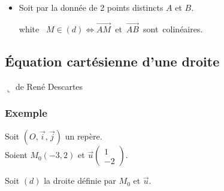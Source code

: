 \begin{itemize}
\item Soit par la donnée de 2 points distincts $A$ et $B$.

\begin{center}
\end{center}

\vspace{.5cm}

\begin{center}
      {white}{
     \hbox{
       $M\in(d)\Longleftrightarrow\overrightarrow{AM}$ 
           et $\overrightarrow{AB}$ sont colinéaires.}}
\end{center}

\end{itemize}

\newpage 


\subsection{Équation cartésienne d'une droite}
\vspace{-.4cm}\hspace{3cm}$\llcorner$ {\footnotesize de René Descartes}

\subsubsection{Exemple }
Soit $(O, \vec{i}, \vec{j})$ un repère. \\
Soient $M_{0}(-3,2) $ et $\vec{u}\left(\begin{array}{c}
                                    1\\
                                    -2
                               \end{array}\right)$.
                 
Soit $(d)$ la droite définie par $M_{0}$ et $\vec{u}$.

